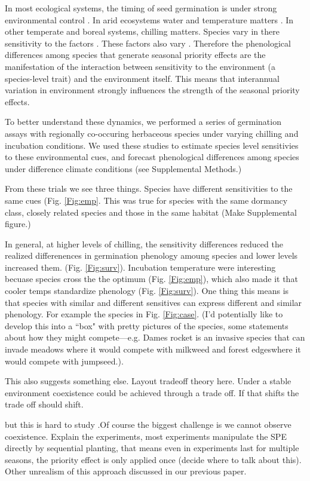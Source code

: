 \documentclass{article}[12pt]
\begin{document}
\begin{enumerate}
In most ecological systems, the timing of seed germination is under strong environmental control \citep{}. In arid ecosystems water and temperature matters \citep{}. In other temperate and boreal systems, chilling matters. Species vary in there sensitivity to the factors \citep{}. These factors also vary \citep{}. Therefore the phenological differences among species that generate seasonal priority effects are the manifestation of the interaction between sensitivity to the environment (a species-level trait) and the environment itself. This means that interannual variation in environment strongly influences the strength of the seasonal priority effects.

To better understand these dynamics, we performed a series of germination assays with regionally co-occuring herbaceous species under varying chilling and incubation conditions. We used these studies to estimate species level sensitivies to these environmental cues, and forecast phenological differences among species under difference climate conditions (see Supplemental Methods.)

From these trials we see three things. Species have different sensitivities to the same cues (Fig. \ref{Fig:emp}. This was true for species with the same dormancy class, closely related species and those in the same habitat (Make Supplemental figure.)

In general, at higher levels of chilling, the sensitivity differences reduced the realized differenences in germination phenology amoung species and lower levels increased them. (Fig. \ref{Fig:surv}). Incubation temperature were interesting becuase species cross the the optimum (Fig. \ref{Fig:emp}), which also made it that cooler temps standardize phenology (Fig. \ref{Fig:surv}). One thing this means is that species with similar and different sensitives can express different and similar phenology. For example the species in Fig. \ref{Fig:case}. (I'd potentially like to develop this into a ``box" with pretty pictures of the species, some statements about how they might compete---e.g. Dames rocket is an invasive species that can invade meadows where it would compete with milkweed and forest edgeswhere it would compete with jumpseed.).

This also suggests something else. Layout tradeoff theory here. Under a stable environment coexistence could be achieved through a trade off. If that shifts the trade off should shift.

but this is hard to study .Of course the biggest challenge is we cannot observe coexistence. Explain the experiments, most experiments manipulate the SPE directly by sequential planting, that means even in experiments last for multiple seasons, the priority effect is only applied once (decide where to talk about this). Other unrealism of this approach discussed in our previous paper.


\end{enumerate}
\end{document}
